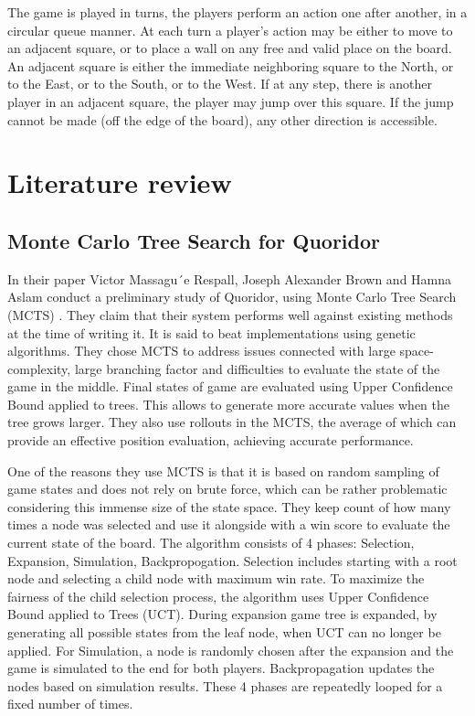 \documentclass{article}
\begin{document}
	The game is played in turns, the players perform an action one after another, in a circular queue manner. At each turn a player’s action may be either to move to an adjacent square, or to place a wall on any free and valid place on the board. An adjacent square is either the immediate neighboring square to the North, or to the East, or to the South, or to the West. If at any step, there is another player in an adjacent square, the player may jump over this square. If the jump cannot be made (off the edge of the board), any other direction is accessible. 

\section{Literature review}

\subsection{Monte Carlo Tree Search for Quoridor} \indent

In their paper Victor Massagu´e Respall, Joseph Alexander Brown and Hamna Aslam conduct a preliminary study of Quoridor, using Monte Carlo Tree Search (MCTS) \cite{monte_carlo}. They claim that their system performs well against existing methods at the time of writing it. It is said to beat implementations using genetic algorithms. They chose MCTS to address issues connected with large space-complexity, large branching factor and difficulties to evaluate the state of the game in the middle. Final states of game are evaluated using Upper Confidence Bound applied to trees. This allows to generate more accurate values when the tree grows larger. They also use rollouts in the MCTS, the average of which can provide an effective position evaluation, achieving accurate performance. 

One of the reasons they use MCTS is that it is based on random sampling of game states and does not rely on brute force, which can be rather problematic considering this immense size of the state space. They keep count of how many times a node was selected and use it alongside with a win score to evaluate the current state of the board. The algorithm consists of 4 phases: Selection, Expansion, Simulation, Backpropogation. Selection includes starting with a root node and selecting a child node with maximum win rate. To maximize the fairness of the child selection process, the algorithm uses Upper Confidence Bound applied to Trees (UCT). During expansion game tree is expanded, by generating all possible states from the leaf node, when UCT can no longer be applied. For Simulation, a node is randomly chosen after the expansion and the game is simulated to the end for both players. Backpropagation updates the nodes based on simulation results. These 4 phases are repeatedly looped for a fixed number of times. 
\end{document}
